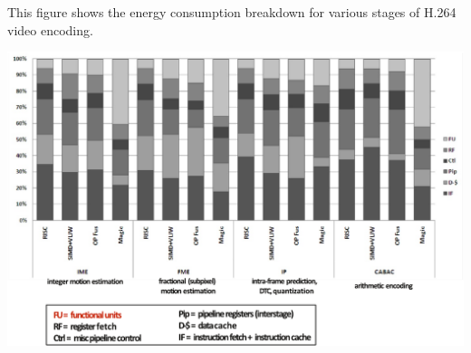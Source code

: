 \newpage

\begin{examplebox}
    This figure shows the energy consumption breakdown for various stages of H.264 video encoding.

    \begin{center}
        \includegraphics[width=\textwidth]{img/h264-example-1.pdf}
    \end{center}
    

\end{examplebox}
